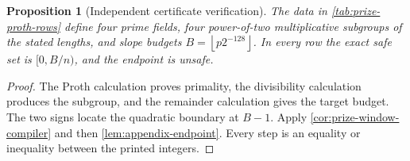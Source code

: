 \documentclass[11pt,a4paper]{amsart}
\numberwithin{equation}{section}
\newtheorem{proposition}[proposition]{Proposition}
\theoremstyle{remark}
\newcommand{\floor}[1]{\left\lfloor #1\right\rfloor}
\begin{document}
\begin{proposition}[Independent certificate verification]
\label{prop:appendix-certificate-verification}
The data in \cref{tab:prize-proth-rows} define four prime fields, four
power-of-two multiplicative subgroups of the stated lengths, and slope
budgets \(B=\floor{p2^{-128}}\).  In every row the exact safe set is
\([0,B/n)\), and the endpoint is unsafe.
\end{proposition}

\begin{proof}
The Proth calculation proves primality, the divisibility calculation
produces the subgroup, and the remainder calculation gives the target
budget.  The two signs locate the quadratic boundary at \(B-1\).
Apply \cref{cor:prize-window-compiler} and then
\cref{lem:appendix-endpoint}.  Every step is an equality or inequality
between the printed integers.
\end{proof}
\end{document}
